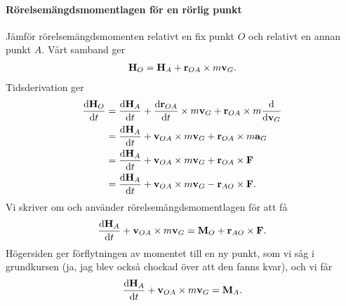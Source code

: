 \paragraph{Rörelsemängdsmomentlagen för en rörlig punkt}
Jämför rörelsemängdsmomenten relativt en fix punkt $O$ och relativt en annan punkt $A$. Vårt samband ger
\begin{align*}
	\vb{H}_{O} = \vb{H}_{A} + \vb{r}_{OA}\times m\vb{v}_{G}.
\end{align*}
Tidsderivation ger
\begin{align*}
	\dv{\vb{H}_{O}}{t} &= \dv{\vb{H}_{A}}{t} + \dv{\vb{r}_{OA}}{t}\times m\vb{v}_{G} + \vb{r}_{OA}\times m\dv{\vb{v}_{G}} \\
	                   &= \dv{\vb{H}_{A}}{t} + \vb{v}_{OA}\times m\vb{v}_{G} + \vb{r}_{OA}\times m\vb{a}_{G} \\
	                   &= \dv{\vb{H}_{A}}{t} + \vb{v}_{OA}\times m\vb{v}_{G} + \vb{r}_{OA}\times\vb{F} \\
	                   &= \dv{\vb{H}_{A}}{t} + \vb{v}_{OA}\times m\vb{v}_{G} - \vb{r}_{AO}\times\vb{F}.
\end{align*}
Vi skriver om och använder rörelsemängdsmomentlagen för att få
\begin{align*}
	\dv{\vb{H}_{A}}{t} + \vb{v}_{OA}\times m\vb{v}_{G} = \vb{M}_{O} + \vb{r}_{AO}\times\vb{F}.
\end{align*}
Högersiden ger förflytningen av momentet till en ny punkt, som vi såg i grundkursen (ja, jag blev också chockad över att den fanns kvar), och vi får
\begin{align*}
	\dv{\vb{H}_{A}}{t} + \vb{v}_{OA}\times m\vb{v}_{G} = \vb{M}_{A}.
\end{align*}